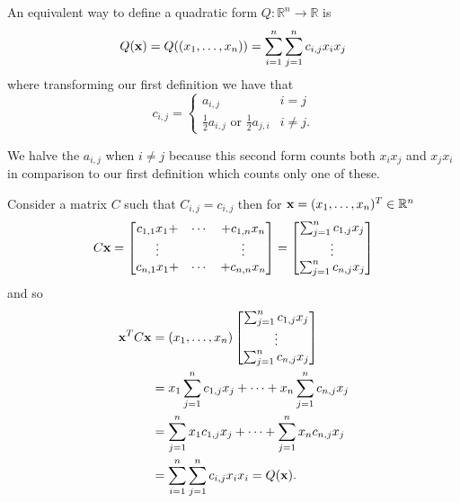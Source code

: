 \documentclass{book}
\begin{document}

An equivalent way to define a quadratic form $Q:\mathbb{R}^n\rightarrow \mathbb{R}$ is
$$
Q({\bf x})=Q((x_1,\ldots,x_n))=\sum_{i=1}^{n} \sum_{j =1}^{n}c_{i,j} x_ix_j
$$
where transforming our first definition we have that
$$
c_{i,j}=
\begin{cases}
a_{i,j}&i=j\\
\frac{1}{2}a_{i,j}\text{ or }\frac{1}{2}a_{j,i}&i\neq j.
\end{cases}
$$

We halve the $a_{i,j}$ when $i \neq j$ because this second form counts both $x_ix_j$ and $x_jx_i$ in comparison to our first definition which counts only one of these. 

Consider a matrix $C$ such that $C_{i,j}=c_{i,j}$ then for ${\bf x}=(x_1,\ldots,x_n)^T \in \mathbb{R}^n$ 
$$
C{\bf x}=
\begin{bmatrix}
c_{1,1}x_1+&\cdots&+c_{1,n}x_n\\
\vdots&&\vdots\\
c_{n,1}x_1+&\cdots&+c_{n,n}x_n
\end{bmatrix}
=
\begin{bmatrix}
\sum_{j=1}^{n}c_{1,j}x_j\\
\vdots\\
\sum_{j=1}^{n}c_{n,j}x_j
\end{bmatrix}
$$
and so 
$$
\begin{aligned}
{\bf x}^TC{\bf x}&=(x_1,\ldots,x_n)
\begin{bmatrix}
\sum_{j=1}^{n}c_{1,j}x_j\\
\vdots\\
\sum_{j=1}^{n}c_{n,j}x_j
\end{bmatrix}\\
&=x_1\sum_{j=1}^{n}c_{1,j}x_j+\cdots+x_n\sum_{j=1}^{n}c_{n,j}x_j\\
&=\sum_{j=1}^{n}x_1c_{1,j}x_j+\cdots+\sum_{j=1}^{n}x_nc_{n,j}x_j\\
&=\sum_{i=1}^{n}\sum_{j=1}^{n}c_{i,j}x_ix_i=Q({\bf x}).
\end{aligned}
$$
\end{document}
